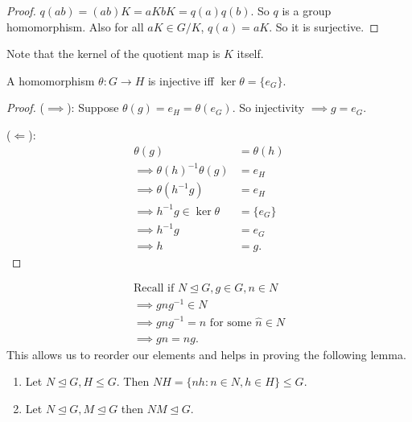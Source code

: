 \begin{proof}
  $q(ab) = (ab)K = aKbK = q(a)q(b)$. So $q$ is a group homomorphism. Also for all $aK \in G/K$, $q(a) = aK$. So it is surjective.
\end{proof}

Note that the kernel of the quotient map is $K$ itself.

\begin{lemma}
\protect\hypertarget{lem:thirteen}{}\label{lem:thirteen}A homomorphism \(\theta : G \to H\) is injective iff \(\ker \theta = \{ e_G \}\).
\end{lemma}

\begin{proof}
(\(\implies\)): Suppose \(\theta(g) = e_H = \theta (e_G)\).
So injectivity \(\implies g = e_G\).

(\(\Longleftarrow\)): \begin{align*}
    \theta(g) &= \theta(h) \\
    \implies \theta(h)^{-1} \theta(g) &= e_H \\
    \implies \theta(h^{-1} g) &= e_H \\
    \implies h^{-1} g \in \ker \theta &= \{ e_G \} \\
    \implies h^{-1} g &= e_G \\
    \implies h &= g.
\end{align*}
\end{proof}

\begin{align*}
    \text{Recall if } N \trianglelefteq G, g \in G, n \in N \\
    \implies gng^{-1} \in N \\
    \implies gng^{-1} = \hat{n} \text{ for some } \hat{n} \in N \\
    \implies gn = \hat{n} g.
\end{align*}
This allows us to reorder our elements and helps in proving the following lemma.

\begin{lemma}
\protect\hypertarget{lem:fourteen}{}\label{lem:fourteen}
\mbox{}
  \begin{enumerate}
  \def\labelenumi{\roman{enumi}.}
  \item
    Let \(N \trianglelefteq G, H \leq G\).
    Then \(NH = \{ nh : n \in N, h \in H \} \leq G\).
  \item
    Let \(N \trianglelefteq G, M \trianglelefteq G\) then \(NM \trianglelefteq G\).
  \end{enumerate}
\end{lemma}

